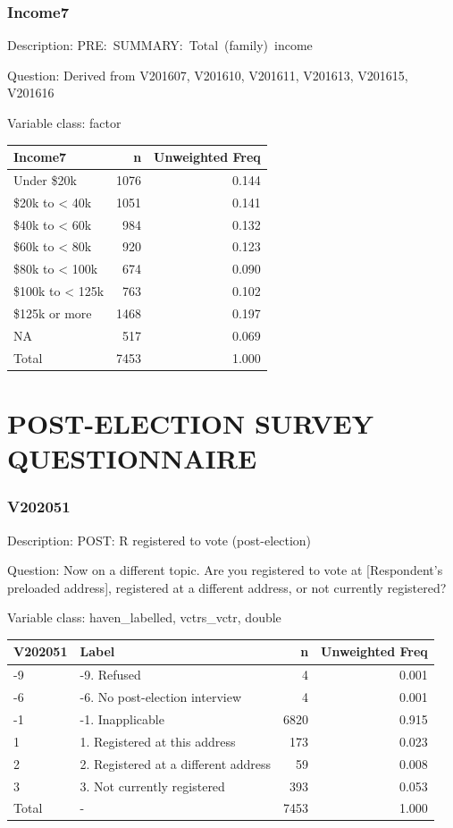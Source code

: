 \documentclass[
]{krantz}
\begin{document}
\hypertarget{income7}{%
\subsubsection*{Income7}\label{income7}}


Description: PRE:~SUMMARY:~Total~(family)~income

Question: Derived from V201607, V201610, V201611, V201613, V201615, V201616

Variable class: factor

\begin{tabular}[t]{l|r|r}
\hline
Income7 & n & Unweighted Freq\\
\hline
Under \$20k & 1076 & 0.144\\
\hline
\$20k to < 40k & 1051 & 0.141\\
\hline
\$40k to < 60k & 984 & 0.132\\
\hline
\$60k to < 80k & 920 & 0.123\\
\hline
\$80k to < 100k & 674 & 0.090\\
\hline
\$100k to < 125k & 763 & 0.102\\
\hline
\$125k or more & 1468 & 0.197\\
\hline
NA & 517 & 0.069\\
\hline
Total & 7453 & 1.000\\
\hline
\end{tabular}

\hypertarget{post-election-survey-questionnaire}{%
\section{POST-ELECTION SURVEY QUESTIONNAIRE}\label{post-election-survey-questionnaire}}

\hypertarget{v202051}{%
\subsubsection*{V202051}\label{v202051}}


Description: POST: R registered to vote (post-election)

Question: Now on a different topic. Are you registered to vote at {[}Respondent's preloaded address{]}, registered at a different address, or not currently registered?

Variable class: haven\_labelled, vctrs\_vctr, double

\begin{tabular}[t]{l|l|r|r}
\hline
V202051 & Label & n & Unweighted Freq\\
\hline
-9 & -9. Refused & 4 & 0.001\\
\hline
-6 & -6. No post-election interview & 4 & 0.001\\
\hline
-1 & -1. Inapplicable & 6820 & 0.915\\
\hline
1 & 1. Registered at this address & 173 & 0.023\\
\hline
2 & 2. Registered at a different address & 59 & 0.008\\
\hline
3 & 3. Not currently registered & 393 & 0.053\\
\hline
Total & - & 7453 & 1.000\\
\hline
\end{tabular}
\end{document}
